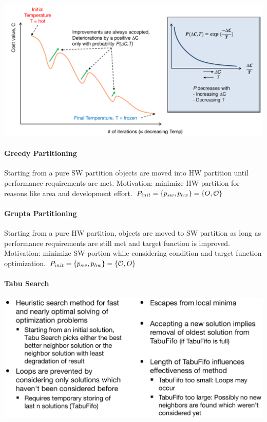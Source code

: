 \documentclass[english]{latex4ei/latex4ei_sheet}
\begin{document}
\begin{center}
  \includegraphics[width=0.8\linewidth]{assets/SimulatedAnnealing.png}
  \label{fig:simulatedannealing}
\end{center}

\paragraph{Greedy Partitioning}
Starting from a pure SW partition objects are moved into HW partition until performance requirements are met. Motivation: minimize HW partition for reasons like area and development effort.
$P_{init} = \{ p_{sw}, p_{hw} \} = \{ O, \operatorname{\mathcal O} \}$

\paragraph{Grupta Partitioning}
Starting from a pure HW partition, objects are moved to SW partition as long as performance requirements are still met and target function is improved. Motivation: minimize SW portion while considering condition and target function optimization.
$P_{init} = \{ p_{sw}, p_{hw} \} = \{ \operatorname{\mathcal O}, O \}$

\paragraph{Tabu Search}

\begin{center}
  \centering
  \includegraphics[width=\linewidth]{assets/TabuSearch.png}
  \label{fig:tabusearch}
\end{center}
\end{document}
